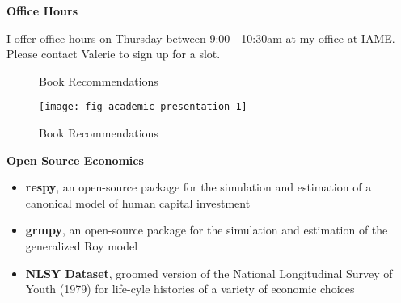 \begin{frame}
	\textbf{Office Hours}\vspace{0.3cm}

I offer office hours on Thursday between 9:00 - 10:30am at my office at IAME. Please contact Valerie to sign up for a slot.

\end{frame}
\begin{frame}
	\begin{figure}
		\caption{Book Recommendations}
		\centering
		\hspace{25pt}
	\end{figure}
\end{frame}
\begin{frame}
	\begin{figure}
		\caption{Book Recommendations}
		\centering
		\texttt{[image: fig-academic-presentation-1]}
	\end{figure}
\end{frame}
\begin{frame}\textbf{Open Source Economics}\vspace{0.3cm}

\begin{itemize}\setlength\itemsep{1em}
\item \textbf{respy}, an open-source package for the simulation and estimation of a canonical model of human capital investment
\item \textbf{grmpy}, an open-source package for the simulation and estimation of the generalized Roy model
\item \textbf{NLSY Dataset}, groomed version of the National Longitudinal Survey of Youth (1979) for life-cyle histories of a variety of economic choices
\end{itemize}

\end{frame}
